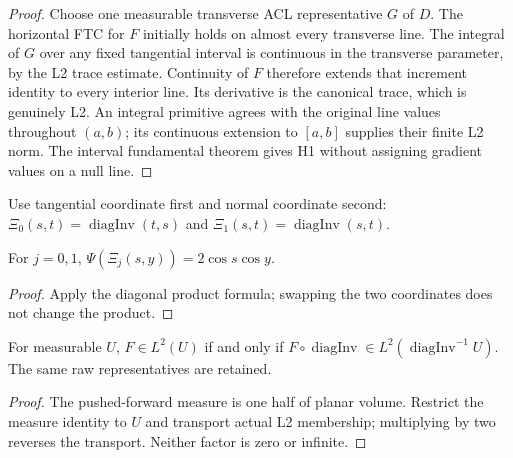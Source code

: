 \begin{proof}
\leanok
Choose one measurable transverse ACL representative $G$ of $D$.
The horizontal FTC for $F$ initially holds on almost every transverse line.
The integral of $G$ over any fixed tangential interval is continuous in the
transverse parameter, by the L2 trace estimate.
Continuity of $F$ therefore extends that increment identity to every interior
line. Its derivative is the canonical trace, which is genuinely L2.
An integral primitive agrees with the original line values throughout $(a,b)$;
its continuous extension to $[a,b]$ supplies their finite L2 norm.
The interval fundamental theorem gives H1 without assigning gradient values
on a null line.
\end{proof}

\begin{definition}
\label{def:diagonal-trace-chart}
\leanok
Use tangential coordinate first and normal coordinate second:
$\Xi_0(s,t)=\operatorname{diagInv}(t,s)$ and
$\Xi_1(s,t)=\operatorname{diagInv}(s,t)$.
\end{definition}

\begin{lemma}
\label{lem:diagonal-trace-product}
\leanok
For $j=0,1$, $\Psi(\Xi_j(s,y))=2\cos s\cos y$.
\end{lemma}

\begin{proof}
\leanok
Apply the diagonal product formula; swapping the two coordinates
does not change the product.
\end{proof}

\begin{lemma}
\label{lem:diagonal-l2-transport}
\leanok
For measurable $U$,
$F\in L^2(U)$ if and only if
$F\circ\operatorname{diagInv}\in L^2(\operatorname{diagInv}^{-1}U)$.
The same raw representatives are retained.
\end{lemma}

\begin{proof}
\leanok
The pushed-forward measure is one half of planar volume.
Restrict the measure identity to $U$ and transport actual L2 membership;
multiplying by two reverses the transport. Neither factor is zero or infinite.
\end{proof}

